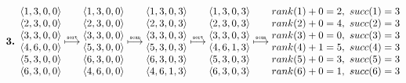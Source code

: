 %
\begin{align*}
  \text{\bf 3. }
  \begin{matrix}
    \langle 1, 3, 0, 0 \rangle \\
    \langle 2, 3, 0, 0 \rangle \\
    \langle 3, 3, 0, 0 \rangle \\
    \langle 4, 6, 0, 0 \rangle \\
    \langle 5, 3, 0, 0 \rangle \\
    \langle 6, 3, 0, 0 \rangle \\
  \end{matrix}
  \stackrel{\text{\tiny \tt sort}}{\longmapsto}
  \begin{matrix}
    \langle 1, 3, 0, 0 \rangle \\
    \langle 2, 3, 0, 0 \rangle \\
    \langle 3, 3, 0, 0 \rangle \\
    \langle 5, 3, 0, 0 \rangle \\
    \langle 6, 3, 0, 0 \rangle \\
    \langle 4, 6, 0, 0 \rangle \\
  \end{matrix}
  \stackrel{\text{\tiny \tt scan}}{\longmapsto}
  \begin{matrix}
    \langle 1, 3, 0, 3 \rangle \\
    \langle 2, 3, 0, 3 \rangle \\
    \langle 3, 3, 0, 3 \rangle \\
    \langle 5, 3, 0, 3 \rangle \\
    \langle 6, 3, 0, 3 \rangle \\
    \langle 4, 6, 1, 3 \rangle \\
  \end{matrix}
  \stackrel{\text{\tiny \tt sort}}{\longmapsto}
  \begin{matrix}
    \langle 1, 3, 0, 3 \rangle \\
    \langle 2, 3, 0, 3 \rangle \\
    \langle 3, 3, 0, 3 \rangle \\
    \langle 4, 6, 1, 3 \rangle \\
    \langle 5, 3, 0, 3 \rangle \\
    \langle 6, 3, 0, 3 \rangle \\
  \end{matrix}
  \stackrel{\text{\tiny \tt scan}}{\longmapsto}
  \begin{matrix}
    rank(1) + 0 = 2,\ succ(1) = 3 \\
    rank(2) + 0 = 4,\ succ(2) = 3 \\
    rank(3) + 0 = 0,\ succ(3) = 3 \\
    rank(4) + 1 = 5,\ succ(4) = 3 \\
    rank(5) + 0 = 3,\ succ(5) = 3 \\
    rank(6) + 0 = 1,\ succ(6) = 3 \\
  \end{matrix}
\end{align*}
